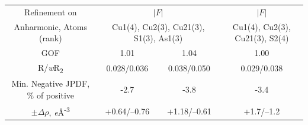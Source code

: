 \documentclass[preprint,review,12pt]{elsarticle}
\begin{document}
\begin{table}
{\begin{tabular}{cccc}
Refinement on                                              & \multicolumn{2}{c}{$|F|$}	                                	             & $|F|$	\\
Anharmonic, Atoms (rank)                                   & \multicolumn{2}{c}{Cu1(4), Cu2(3), Cu21(3), S1(3), As1(3)}	  	             & Cu1(4), Cu2(3), Cu21(3), S2(4)	\\
GOF                                                        & 1.01	                                                       & 1.04	         & 1.00	\\
R/{\it w}R\textsubscript{2}                                & 0.028/0.036	                                               & 0.038/0.050	 & 0.029/0.038	\\
Min. Negative JPDF, \% of positive                         & -2.7	                                                       & 	-3.8             & -3.4	\\
$\pm\Delta\rho$, {\it e}\AA\textsuperscript{-3}            & +0.64/–0.76	                                                 & +1.18/–0.61	 & +1.7/–1.2	\\


\end{tabular}}
\end{table}
\end{document}
